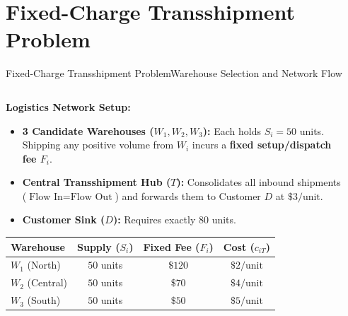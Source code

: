 \documentclass[aspectratio=169]{beamer}
\begin{document}
\section{Fixed-Charge Transshipment Problem}
\begin{frame}\sectionpage\end{frame}

\begin{frame}{Fixed-Charge Transshipment Problem}{Warehouse Selection and Network Flow}
\begin{columns}[T,onlytextwidth]
\begin{column}{0.51\textwidth}
  \footnotesize
  \textbf{Logistics Network Setup:}
  \begin{itemize}\setlength{\itemsep}{2pt}
    \item \textbf{3 Candidate Warehouses ($W_1, W_2, W_3$):} Each holds $S_i = 50$ units. Shipping any positive volume from $W_i$ incurs a \textbf{fixed setup/dispatch fee $F_i$}.
    \item \textbf{Central Transshipment Hub ($T$):} Consolidates all inbound shipments ($\text{Flow In} = \text{Flow Out}$) and forwards them to Customer $D$ at $\$3/\text{unit}$.
    \item \textbf{Customer Sink ($D$):} Requires exactly $80$ units.
  \end{itemize}
  \vspace{2pt}
  \centering
  {\scriptsize\setlength{\tabcolsep}{3.5pt}
  \begin{tabular}{@{}lccc@{}}
    \toprule
    \textbf{Warehouse} & \textbf{Supply ($S_i$)} & \textbf{Fixed Fee ($F_i$)} & \textbf{Cost ($c_{iT}$)} \\
    \midrule
    $W_1$ (North)   & $50$ units & $\$120$ & $\$2/\text{unit}$ \\
    $W_2$ (Central) & $50$ units & $\$70$  & $\$4/\text{unit}$ \\
    $W_3$ (South)   & $50$ units & $\$50$  & $\$5/\text{unit}$ \\
    \bottomrule
  \end{tabular}}
\end{column}
\begin{column}{0.46\textwidth}
  \centering
  \vspace{4pt}
\end{column}
\end{columns}
\end{frame}
\end{document}
